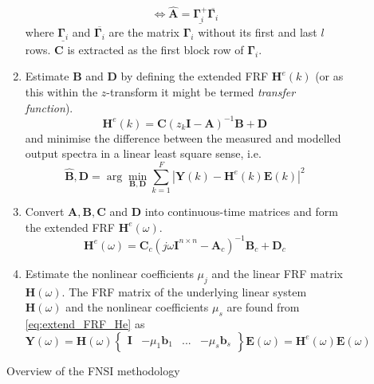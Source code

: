 \begin{figure}[!ht]
\begin{mdframed}
\begin{enumerate}
\begin{equation*}
        \iff
        \hat {\bm A} = \underline{\bm \Gamma^+_i} \overline{\bm \Gamma_i}
      \end{equation*}
      where $\underline{\bm \Gamma_i}$ and $\overline{\bm \Gamma_i}$ are the
      matrix $\bm \Gamma_i$ without its first and last $l$ rows.
      $\bm C$ is extracted as the first block row of $\bm \Gamma_i$.
    \item Estimate $\bm B$ and $\bm D$ by defining the extended FRF  $\bm
      H^e(k)$ (or as this within the $z$-transform it might be termed
      \textit{transfer function}).
      \begin{equation*}
        \bm H^e(k) = \bm C(z_k \bm I - \bm A)^{-1} \bm B + \bm D
      \end{equation*}
      and minimise the difference between the measured and modelled output
      spectra in a linear least square sense, i.e.
      \begin{equation*}
        \hat {\bm B}, \hat {\bm D} = \arg \min_{\bm B, \bm D} \sum_{k=1}^F |\bm Y(k) - \bm H^e(k) \bm E(k)|^2
      \end{equation*}
    \item Convert $\bm A, \bm B, \bm C$ and $\bm D$ into continuous-time
      matrices and form the extended FRF $\bm H^e(\omega)$.
      \begin{equation}
        \label{eq:extend_FRF_He}
        \bm H^e(\omega) = \bm C_c \left(j \omega \bm I^{n \times n} - \bm A_c \right)^{-1} \bm B_c + \bm D_c
      \end{equation}
    \item Estimate the nonlinear coefficients $\mu_j$ and the linear FRF matrix
      $\bm H(\omega)$.
      The FRF matrix of the underlying linear system $\bm H(\omega)$ and the
      nonlinear coefficients $\mu_s$ are found from \eqref{eq:extend_FRF_He} as
      \begin{equation}
        \label{eq:FRE_H}
        \bm Y(\omega) = \bm H(\omega)
        \begin{Bmatrix}
          \bm I & -\mu_1\bm b_1 & ... & -\mu_s \bm b_s
        \end{Bmatrix}
        \bm E (\omega)
        =
        \bm H^e(\omega) \bm E(\omega)
      \end{equation}
    \end{enumerate}
  \end{mdframed}
  \caption{Overview of the FNSI methodology}
  \label{fig:fnsi_methodolgoy}
\end{figure}

